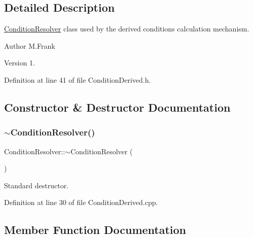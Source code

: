 \subsection{Detailed Description}
\hyperlink{class_d_d4hep_1_1_conditions_1_1_condition_resolver}{Condition\+Resolver} class used by the derived conditions calculation mechanism. 

\begin{DoxyAuthor}{Author}
M.\+Frank 
\end{DoxyAuthor}
\begin{DoxyVersion}{Version}
1. 
\end{DoxyVersion}


Definition at line 41 of file Condition\+Derived.\+h.



\subsection{Constructor \& Destructor Documentation}
\hypertarget{class_d_d4hep_1_1_conditions_1_1_condition_resolver_abb26bddb3600ca97c9b40cc3a3ad1d40}{}\label{class_d_d4hep_1_1_conditions_1_1_condition_resolver_abb26bddb3600ca97c9b40cc3a3ad1d40} 
\subsubsection{\texorpdfstring{$\sim$\+Condition\+Resolver()}{~ConditionResolver()}}
{\footnotesize\ttfamily Condition\+Resolver\+::$\sim$\+Condition\+Resolver (\begin{DoxyParamCaption}{ }\end{DoxyParamCaption})\hspace{0.3cm}{\ttfamily [virtual]}}



Standard destructor. 



Definition at line 30 of file Condition\+Derived.\+cpp.



\subsection{Member Function Documentation}
\hypertarget{class_d_d4hep_1_1_conditions_1_1_condition_resolver_a8d33b49336349b3cf4877244572f1827}{}\label{class_d_d4hep_1_1_conditions_1_1_condition_resolver_a8d33b49336349b3cf4877244572f1827} 
